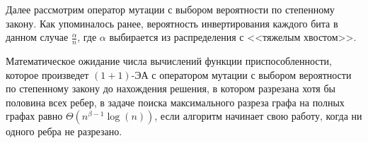 \documentclass[times]{itmo-student-thesis}
\newcommand{\oea}{\mbox{$(1 + 1)$-ЭА}\xspace}
\begin{document}

Далее рассмотрим оператор мутации с выбором вероятности по степенному закону. Как упоминалось ранее, вероятность инвертирования каждого бита в данном случае $\frac{\alpha}{n}$, где $\alpha$ выбирается из распределения с <<тяжелым хвостом>>.

\begin{theorem} \label{thm:power}
  Математическое ожидание числа вычислений функции приспособленности, которое произведет \oea с оператором мутации с выбором вероятности по степенному закону до нахождения решения, в котором разрезана хотя бы половина всех ребер, в задаче поиска максимального разреза графа на полных графах равно $\Theta(n^{\beta - 1}\log(n))$, если алгоритм начинает свою работу, когда ни одного ребра не разрезано.
\end{theorem}
\end{document}

